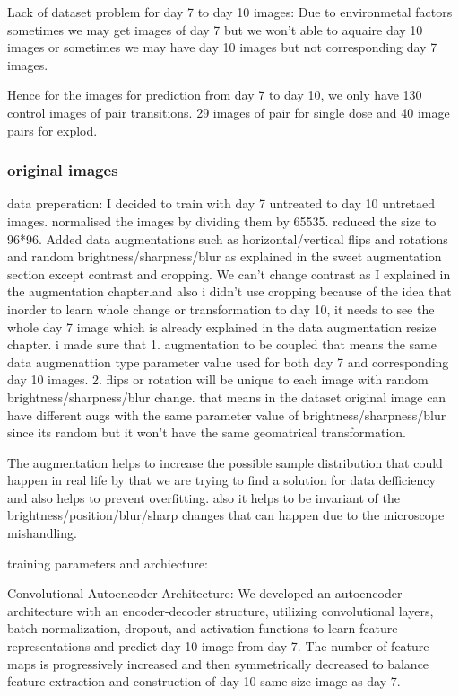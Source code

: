 Lack of dataset problem for day 7 to day 10 images:
Due to environmetal factors sometimes we may get images of day 7  but we won't able to aquaire  day 10 images or sometimes we may have day 10 images but not corresponding day 7 images. 

Hence for the images for prediction from day 7 to day 10, we only have 130 control images of pair transitions. 29 images of pair for single dose and 40 image pairs for explod. 

\subsubsection*{original images}
data preperation: I decided to train with day 7 untreated to day 10 untretaed images.
 normalised the images by dividing them by 65535. reduced the size to 96*96. Added data augmentations such as horizontal/vertical flips and rotations and random brightness/sharpness/blur as explained in the sweet augmentation section  except contrast and cropping. We can't change contrast  as I explained in the augmentation chapter.and also i didn't use cropping because of the idea that inorder to learn whole change or transformation to day 10, it needs to see the whole day 7 image which is already explained in the data augmentation resize chapter. i made sure that 
 1. augmentation to be coupled that means the same  data augmenattion type parameter value used for both day 7 and corresponding day 10 images. 
 2.  flips or rotation will be unique to each image with random brightness/sharpness/blur change. that means in the dataset original image can have different augs with the same parameter value of brightness/sharpness/blur since its random but it won't have the same geomatrical transformation.

The augmentation helps to increase the possible sample distribution that could happen in real life by that we are trying to find a solution for data defficiency and also helps to prevent overfitting. also it helps to be invariant of the brightness/position/blur/sharp changes that can happen due to the microscope mishandling. 


training parameters and archiecture:

Convolutional Autoencoder Architecture:
We developed an autoencoder architecture with an encoder-decoder structure, utilizing convolutional layers, batch normalization, dropout, and activation functions
 to learn feature representations and predict day 10 image from day 7. The number of feature maps is progressively increased and then symmetrically decreased to balance
  feature extraction and construction of day 10 same size image as day 7.   


